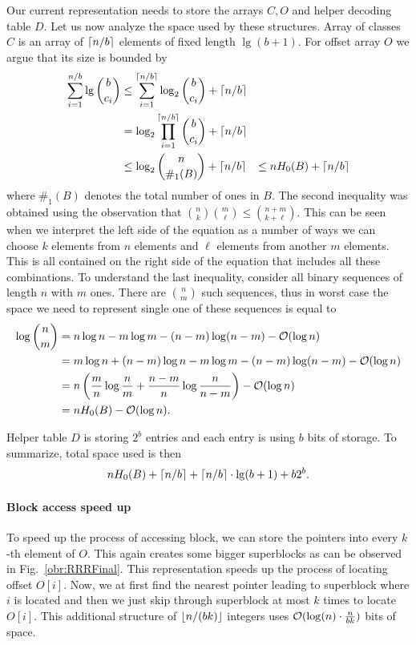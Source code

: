 Our current representation needs to store the arrays $C, O$ and helper decoding table $D$. Let us now
analyze the space used by these structures. Array of classes $C$ is an array of $\left\lceil n/b \right\rceil$ elements
of fixed length $\lg (b+1)$. For offset array $O$ we argue that its size is bounded by
\begin{align*}
    \sum_{i=1}^{n/b} \mathop{\mathrm{lg}} {b\choose c_i}
    &\leq \sum_{i=1}^{\left\lceil n/b \right\rceil} \log_2 {b\choose c_i} + \left\lceil n/b \right\rceil \\
    &= \log_2\prod_{i=1}^{\left\lceil n/b \right\rceil} {b\choose c_i} + \left\lceil n/b \right\rceil \\
    &\leq \log_2{n\choose \#_1(B)} + \left\lceil n/b \right\rceil &\leq nH_0(B) + \left\lceil n/b \right\rceil
\end{align*}
where $\#_1(B)$ denotes the total number of ones in $B$. The second inequality was obtained using
the observation that ${n\choose k} {m\choose \ell} \leq {n+m\choose k+\ell}$. This can be seen
when we interpret the left side of the equation as a number of ways we can choose $k$ elements
from $n$ elements and $\ell$ elements from another $m$ elements. This is all contained on the
right side of the equation that includes all these combinations. To understand the last inequality,
consider all binary sequences of length $n$ with $m$ ones. There are ${n\choose m}$ such sequences,
thus in worst case the space we need to represent single one of these sequences is equal to
\begin{align*}
    \log{n\choose m}
    &= n\log n - m\log m - (n-m)\log (n-m) - \mathcal{O}(\log n) \\
    &= m\log n + (n-m)\log n - m\log m - (n-m)\log (n-m) - \mathcal{O}(\log n) \\
    &= n\left(\frac{m}{n}\log\frac{n}{m} + \frac{n-m}{n}\log\frac{n}{n-m}\right)-\mathcal{O}(\log n) \\
    &= nH_0(B) - \mathcal{O}(\log n).
\end{align*}

Helper table $D$ is storing $2^b$ entries and each entry is using $b$ bits of storage. 
To summarize, total space used is then $$nH_0(B) + \left\lceil n/b \right\rceil + \left\lceil n/b \right\rceil \cdot \mathop{\mathrm{lg}}(b+1) + b2^b.$$

\paragraph{Block access speed up}

To speed up the process of accessing block, we can store the pointers into every $k$-th element
of $O$. This again creates some bigger superblocks as can be observed in Fig.~\ref{obr:RRRFinal}.
This representation speeds up the process of locating offset $O[i]$. Now, we at first find the
nearest pointer leading to superblock where $i$ is located and then we just skip through superblock
at most $k$ times to locate $O[i]$. This additional structure of $\left\lfloor n/(bk) \right\rfloor$ integers uses
$\mathcal{O}(\log(n)\cdot \frac{n}{bk})$ bits of space.

